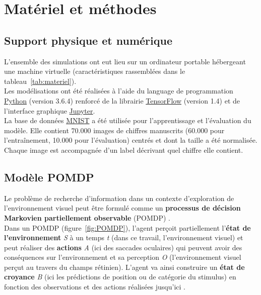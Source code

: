 
\chapter{Matériel et méthodes} %
\label{Materiel_methode} %


\section{Support physique et numérique} %
L'ensemble des simulations ont eut lieu sur un ordinateur portable hébergeant une machine virtuelle (caractéristiques rassemblées dans le tableau~\ref{tab:materiel}).\\
Les modélisations ont été réalisées à l'aide du language de programmation \href{https://www.python.org/}{Python} (version 3.6.4) renforcé de la librairie \href{https://www.tensorflow.org/}{TensorFlow} (version 1.4) et de l'interface graphique \href{https://jupyter.org/}{Jupyter}.\\
La base de données \href{http://yann.lecun.com/exdb/mnist/}{MNIST} a été utilisée pour l'apprentissage et l'évaluation du modèle. Elle contient 70.000 images de chiffres manuscrits (60.000 pour l'entraînement, 10.000 pour l'évaluation) centrés et dont la taille a été normalisée. Chaque image est accompagnée d'un label décrivant quel chiffre elle contient.


\section{Modèle POMDP} %
Le problème de recherche d'information dans un contexte d'exploration de l'environnement visuel peut être formulé comme un \textbf{processus de décision Markovien partiellement observable} (POMDP) \autocite{Butko2010}. \\
Dans un POMDP (figure~\ref{fig:POMDP}), l'agent perçoit partiellement l'\textbf{état de l'environnement} \textit{S} à un temps \textit{t} (dans ce travail, l'environnement visuel) et peut réaliser des \textbf{actions} \textit{A} (ici des saccades oculaires) qui peuvent avoir des conséquences sur l'environnement et sa perception \textit{O} (l'environnement visuel perçut au travers du champs rétinien). L'agent va ainsi construire un \textbf{état de croyance} \textit{B} (ici les prédictions de position ou de catégorie du stimulus) en fonction des observations et des actions réalisées jusqu'ici \autocite{Butko2010}.

